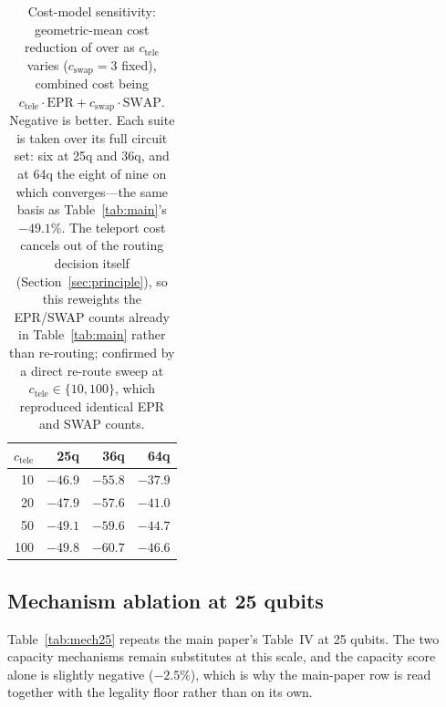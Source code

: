 \begin{table}[t]
\centering
\caption{Cost-model sensitivity: geometric-mean cost reduction of
  \dSABRE{} over \TeleSABRE{} as $c_{\mathrm{tele}}$ varies
  ($c_{\mathrm{swap}}=3$ fixed), combined cost being
  $c_{\mathrm{tele}}\cdot\text{EPR}+c_{\mathrm{swap}}\cdot\text{SWAP}$.
  Negative is better.  Each suite is taken over its full circuit set:
  six at 25q and 36q, and at 64q the eight of nine on which \TeleSABRE{}
  converges---the same basis as Table~\ref{tab:main}'s $-49.1\%$.  The
  teleport cost cancels out of the routing decision itself
  (Section~\ref{sec:principle}), so this reweights the EPR/SWAP counts
  already in Table~\ref{tab:main} rather than re-routing; confirmed by a
  direct re-route sweep at $c_{\mathrm{tele}}\in\{10,100\}$, which
  reproduced identical EPR and SWAP counts.}
\label{tab:sensitivity}
\setlength{\tabcolsep}{6pt}
\small
\begin{tabular}{@{}r rrr@{}}
\toprule
$c_{\mathrm{tele}}$ & 25q & 36q & 64q \\
\midrule
10 & $\mathbf{-46.9}$ & $\mathbf{-55.8}$ & $\mathbf{-37.9}$ \\
20 & $\mathbf{-47.9}$ & $\mathbf{-57.6}$ & $\mathbf{-41.0}$ \\
50 & $\mathbf{-49.1}$ & $\mathbf{-59.6}$ & $\mathbf{-44.7}$ \\
100 & $\mathbf{-49.8}$ & $\mathbf{-60.7}$ & $\mathbf{-46.6}$ \\
\bottomrule
\end{tabular}
\end{table}

\subsection{Mechanism ablation at 25 qubits}
\label{app:mech25}
Table~\ref{tab:mech25} repeats the main paper's Table~IV at 25 qubits.  The
two capacity mechanisms remain substitutes at this scale, and the capacity
score alone is slightly negative ($-2.5\%$), which is why the main-paper row
is read together with the legality floor rather than on its own.

